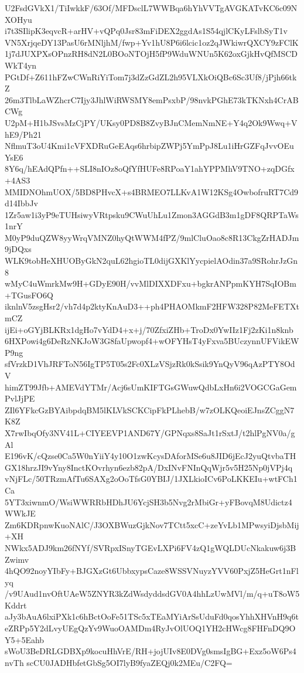 U2FsdGVkX1/TiIwkkF/63Of/MFDsclL7WWBqa6hYhVVTgAVGKATvKC6c09NXOHyu
i7t3SIlipK3eqvcR+arHV+vQPq0Jsr83mFiDEX2ggdAs1S54qjlCKyLFslbSyT1v
VN5XrjqeDY13PasU6rMNljhM/fwp+Yv1hU8P6i6lcic1oz2qJWkiwrQXCY9zFClK
1j7dJUXPXsOPnzRH8dN2L0BOoNTOjH5fP9WduWNUn5K62oxGjkHvQfMSCDWkT4yn
PGtDf+Z611hFZwCWnRiYiTom7j3dZzGdZL2h95VLXkOiQBc6Sc3Uf8/jPjh66tkZ
26m3TlbLaWZhcrC7Ijy3JhlWiRWSMY8emPsxbP/98nvkPGhE73kTKNxh4CrABCWg
U2pM+H1bJSvsMzCjPY/UKsy0PD8B8ZvyBJnCMemNmNE+Y4q2Ok9Wwq+VhE9/Ph21
NflmuT3oU4Kmi1cVFXDRuGeEAqs6hrbipZWPj5YmPpJ8Lu1iHrGZFqJvvOEuYsE6
8Y6q/hEAdQPfn++SLI8nIOz8oQfYfHUFe8RPoaY1ahYPPMhV9TNO+zqDGfx+4AS3
MMIDNOhmUOX/5BD8PHvcX+s4BRMEO7LLKvA1W12KSg4OwbofruRT7Cd9d14IbbJv
1Zr5aw1i3yP9eTUHsiwyVRtpsku9CWuUhLu1Zmon3AGGdB3m1gDF8QRPTaWs1nrY
M0yP9duQZW8yyWrqVMNZ0hyQtWWM4fPZ/9mlCluOao8c8R13CkgZrHADJm9jDQxs
WLK9tobHeXHUOByGkN2quL62hgioTL0dijGXKlYycpielAOdin37a9SRohrJzGn8
wMyC4uWmrkMw9H+GDyE90H/vvMlDIXXDFxu+bgkrANPpmKYH7SqIOBm+TGusFO6Q
iknlnV5zsgHsr2/vh7d4p2ktyKnAuD3++ph4PHAOMkmF2HFW328P82MeFETXtmCZ
ijEi+oGYjBLKRx1dgHo7vYdD4+x+j/70ZfxiZHb+TroDx0YwIIz1Fj2zKi1n8knb
6HXPowi4g6DeRzNKJoW3G8faUpwopf4+wOFYHsT4yFxva5BUczynnUFVikEWP9ng
sfVrzkD1VhJRFToN56IgTP5T05s2Fc0XLzVSjzRk0kSsik9YnQyV96qAzPTY8OdV
himZT99Jfb+AMEVdYTMr/Acj6sUmKIFTGsGWuwQdbLxHn6i2VOGCGaGemPvlJjPE
ZIl6YFkcGzBYAibpdqBM5lKLVkSCKCipFkPLhebB/w7zOLKQeoiEJnsZCggN7K8Z
X7rwIbqOfy3NV41L+CIYEEVP1AND67Y/GPNqxs8SaJt1rSxtJ/t2hlPgNV0a/gAl
E196vK/cQzse0Ca5W0nYiiY4y10O1zwKcysDAforMSe6u8JID6jEcJ2yuQtvbaTH
GX18hrzJI9vYny8InctKOvrhyn6ezb82pA/DxINvFNInQqWjr5v5H25Np0jVPj4q
vNjFLc/50TRzmAfTu6SAXg2oOoTfsG0YBIJ/1JXLkioICv6PoLKKEIu+wtFCh1Ca
5YT3xiwnmO/WsiWWRRbHDhJU6YcjSH3b5Nvg2rMbiGr+yFBovqM8Udictz4WWkJE
Zm6KDRpnwKuoNAlC/J3OXBWuzGjkNov7TCtt5xcC+zeYvLb1MPwsyiDjsbMij+XH
NWkx5ADJ9km26fNYf/SVRpxISnyTGEvLXPi6FV4zQ1gWQLDUcNkakuw6j3BZwimv
4hQO92noyYIbFy+BJGXzGt6UbbxypsCaze8WSSVNuyzYVV60PxjZ5HeGrt1nFlyq
/v9UAud1nvOftUAeW5ZNYR3kZdWsdyddsdGV0A4hhLzUwMVl/m/q+uT8oW5Kddrt
aJy3bAuA6lxiPXk1c6hBctOoFe51TSc5xTEaMYiArSsUduFd0qosYhhXHVnH9q6t
eZRPp5Y2dLvyUEgQzYv9WuoOAMDm4RyJvOlUOQ1YH2cHWcg8FHFnDQ9OY5+5Eahb
sWoU3BeDRLGDBXp9kocuHhVrE/RH+jojUIv8E0DVg0smsIgBG+Exz5oW6Ps4nvTh
scCU0JADHbfetGbSg5OI7lyB9fyaZEQj0k2MEu/C2FQ=
